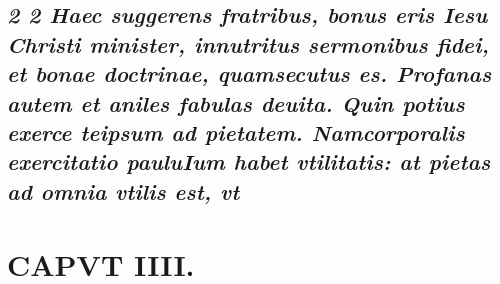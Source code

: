\documentclass{article}
\begin{document}
\begin{pages}
\subsection*{\textit{2 2 Haec suggerens fratribus, bonus eris Iesu Christi minister, innutritus sermonibus fidei, et bonae doctrinae, quamsecutus es. Profanas autem et aniles fabulas deuita. Quin potius exerce teipsum ad pietatem. Namcorporalis exercitatio pauluIum habet vtilitatis: at pietas ad omnia vtilis est, vt }}
\section*{CAPVT IIII. }
\marginpar{[ p.49 ]}
{}

\end{pages}
\end{document}

